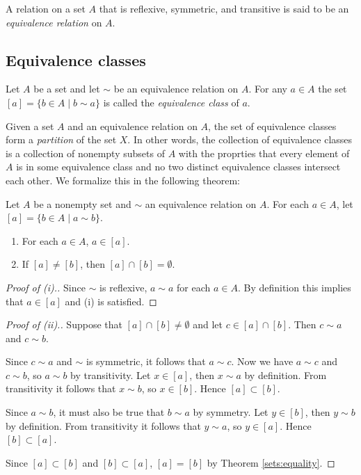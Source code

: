 \begin{definition}
A relation on a set $A$ that is reflexive, symmetric, and transitive is said to be an \emph{equivalence relation} on $A$. 
\end{definition}

\subsection{Equivalence classes}

\begin{definition}
Let $A$ be a set and let $\sim$ be an equivalence relation on $A$.  For any $a\in A$ the set $[a]=\{ b\in A \mid b\sim a\}$ is called the \emph{equivalence class} of $a$.  
\end{definition}

Given a set $A$ and an equivalence relation on $A$, the set of equivalence classes form a \emph{partition} of the set $X$. In other words, the collection of equivalence classes is a collection of nonempty subsets of $A$ with the proprties that every element of $A$ is in some equivalence class and no two distinct equivalence classes intersect each other. We formalize this in the following theorem:

\begin{thrm}
Let $A$ be a nonempty set and $\sim$ an equivalence relation on $A$. For each $a\in A$, let $[a]=\{ b\in A\mid a\sim b\}$.
\begin{enumerate}
\item For each $a\in A$, $a\in[a]$.
\item If $[a]\neq[b]$, then $[a]\cap[b]=\emptyset$.
\end{enumerate}
\end{thrm}

\begin{proof}[Proof of (i).]
Since $\sim$ is reflexive, $a\sim a$ for each $a\in A$.  By definition this implies that $a\in [a]$ and (i) is satisfied.
\end{proof}

\begin{proof}[Proof of (ii).]
Suppose that $[a]\cap[b]\neq\emptyset$ and let $c\in[a]\cap[b]$.  Then $c\sim a$ and $c\sim b$.

Since $c\sim a$ and $\sim$ is symmetric, it follows that $a\sim c$.  Now we have $a\sim c$ and $c\sim b$, so $a\sim b$ by transitivity.  Let $x\in[a]$, then $x\sim a$ by definition.  From transitivity it follows that $x\sim b$, so $x\in[b]$.  Hence $[a]\subset[b]$.

Since $a\sim b$, it must also be true that $b\sim a$ by symmetry.  Let $y\in[b]$, then $y\sim b$ by definition.  From transitivity it follows that $y\sim a$, so $y\in[a]$.  Hence $[b]\subset[a]$.

Since $[a]\subset[b]$ and $[b]\subset[a]$, $[a]=[b]$ by Theorem \ref{sets:equality}.
\end{proof}

